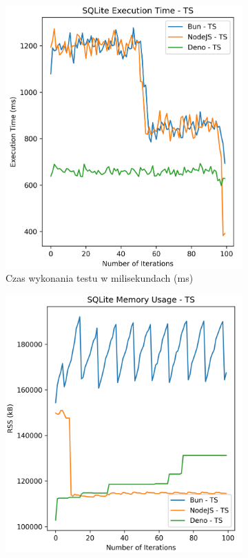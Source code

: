 \begin{figure}[H]
  \centering
  \begin{subfigure}[b]{0.44\textwidth}
    \centering
    \includegraphics[width=\textwidth]{Figures/database/sqlite_100_1000_ts_time.png}
    \caption{Czas wykonania testu w milisekundach (ms)}
    \label{fig:database_e2_ts_time}
  \end{subfigure}
  \begin{subfigure}[b]{0.44\textwidth}
    \centering
    \includegraphics[width=\textwidth]{Figures/database/sqlite_100_1000_ts_memory.png}

\end{subfigure}
\end{figure}

